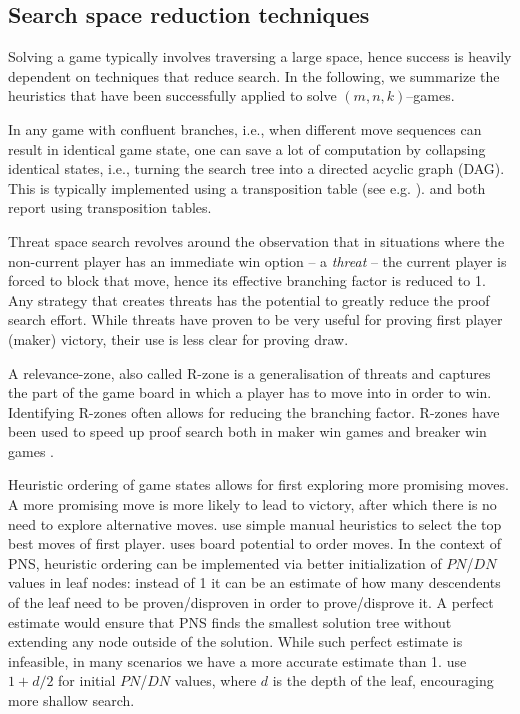 \documentclass[conference]{IEEEtran}
\theoremstyle{definition}
\newcommand{\pn}{$PN$\xspace}
\newcommand{\dn}{$DN$\xspace}
\begin{document}
\subsection{Search space reduction techniques}
Solving a game typically involves traversing a large space, hence success is heavily dependent on techniques that reduce search. In the following, we summarize the heuristics that have been successfully applied to solve $(m,n,k)$--games.

In any game with confluent branches, i.e., when different move sequences can result in identical game state, one can save a lot of computation by collapsing identical states, i.e., turning the search tree into a directed acyclic graph (DAG). This is typically implemented using a transposition table (see e.g. \cite{pns_transposition}). \cite{Allis1994SearchingFS} and \cite{HSU202079} both report using transposition tables.

Threat space search \cite{Allis1994SearchingFS} revolves around the observation that in situations where the non-current player has an immediate win option -- a \emph{threat} -- the current player is forced to block that move, hence its effective branching factor is reduced to 1. Any strategy that creates threats has the potential to greatly reduce the proof search effort. While threats have proven to be very useful for proving first player (maker) victory, their use is less clear for proving draw.

A relevance-zone, also called R-zone is a generalisation of threats and captures the part of the game board in which a player has to move into in order to win. Identifying R-zones often allows for reducing the branching factor. R-zones have been used to speed up proof search both in maker win games \cite{connect_mnkpq,relevance_zone} and breaker win games \cite{HSU202079}.

Heuristic ordering of game states allows for first exploring more promising moves. A more promising move is more likely to lead to victory, after which there is no need to explore alternative moves. \cite{Allis1994SearchingFS} use simple manual heuristics to select the top best moves of first player. \cite{HSU202079} uses board potential to order moves. In the context of PNS, heuristic ordering can be implemented via better initialization of \pn/\dn values in leaf nodes: instead of 1 it can be an estimate of how many descendents of the leaf need to be proven/disproven in order to prove/disprove it. A perfect estimate would ensure that PNS finds the smallest solution tree without extending any node outside of the solution. While such perfect estimate is infeasible, in many scenarios we have a more accurate estimate than 1. \cite{Allis1994SearchingFS} use $1+d/2$ for initial \pn/\dn values, where $d$ is the depth of the leaf, encouraging more shallow search. %
\end{document}
